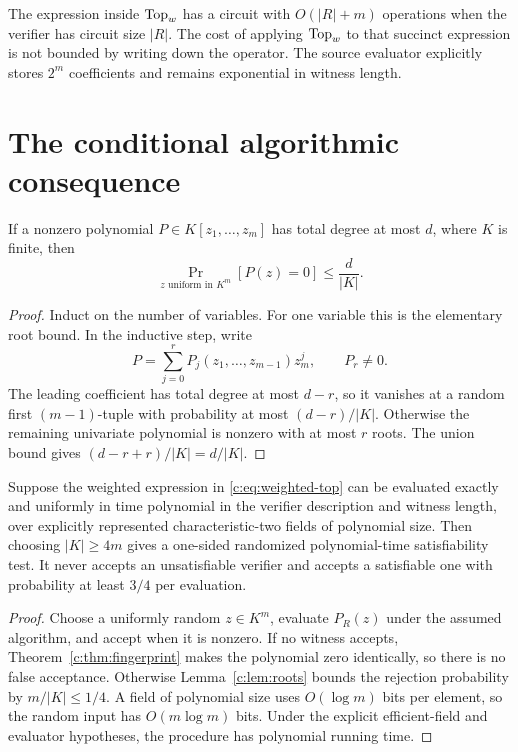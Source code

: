 The expression inside $\operatorname{Top}_w$ has a circuit with $O(|R|+m)$ operations when the verifier has circuit size $|R|$. The cost of applying $\operatorname{Top}_w$ to that succinct expression is not bounded by writing down the operator. The source evaluator explicitly stores $2^m$ coefficients and remains exponential in witness length.

\section{The conditional algorithmic consequence}
\begin{lemma}\label{c:lem:roots}
If a nonzero polynomial $P\in K[z_1,\ldots,z_m]$ has total degree at most $d$, where $K$ is finite, then
\[
 \Pr_{z\text{ uniform in }K^m}[P(z)=0]\le\frac d{|K|}.
\]
\end{lemma}
\begin{proof}
Induct on the number of variables. For one variable this is the elementary root bound. In the inductive step, write
\[
 P=\sum_{j=0}^r P_j(z_1,\ldots,z_{m-1})z_m^j,
 \qquad P_r\ne0.
\]
The leading coefficient has total degree at most $d-r$, so it vanishes at a random first $(m-1)$-tuple with probability at most $(d-r)/|K|$. Otherwise the remaining univariate polynomial is nonzero with at most $r$ roots. The union bound gives $(d-r+r)/|K|=d/|K|$.
\end{proof}

\begin{proposition}\label{c:prop:conditional-sat}
Suppose the weighted expression in \eqref{c:eq:weighted-top} can be evaluated exactly and uniformly in time polynomial in the verifier description and witness length, over explicitly represented characteristic-two fields of polynomial size. Then choosing $|K|\ge4m$ gives a one-sided randomized polynomial-time satisfiability test. It never accepts an unsatisfiable verifier and accepts a satisfiable one with probability at least $3/4$ per evaluation.
\end{proposition}
\begin{proof}
Choose a uniformly random $z\in K^m$, evaluate $P_R(z)$ under the assumed algorithm, and accept when it is nonzero. If no witness accepts, Theorem~\ref{c:thm:fingerprint} makes the polynomial zero identically, so there is no false acceptance. Otherwise Lemma~\ref{c:lem:roots} bounds the rejection probability by $m/|K|\le1/4$. A field of polynomial size uses $O(\log m)$ bits per element, so the random input has $O(m\log m)$ bits. Under the explicit efficient-field and evaluator hypotheses, the procedure has polynomial running time.
\end{proof}

